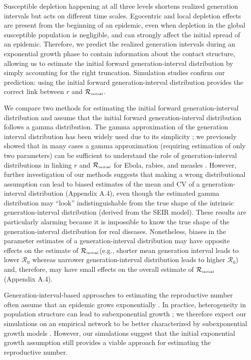 \documentclass[12pt]{article}
\newcommand{\Rx}[1]{\ensuremath{{\mathcal R}_{#1}}\xspace}
\newcommand{\Ro}{\Rx{0}}
\newcommand{\Rini}{\Rx{\textrm{\tiny initial}}}
\begin{document}
Susceptible depletion happening at all three levels shortens realized generation intervals but acts on different time scales.
Egocentric and local depletion effects are present from the beginning of an epidemic, even when depletion in the global susceptible population is negligible, and can strongly affect the initial spread of an epidemic.
Therefore, we predict the realized generation intervals during an exponential growth phase to contain information about the contact structure, allowing us to estimate the initial forward generation-interval distribution by simply accounting for the right truncation.
Simulation studies confirm our prediction: using the initial forward generation-interval distribution provides the correct link between $r$ and $\Rini$.

We compare two methods for estimating the initial forward generation-interval distribution and assume that the initial forward generation-interval distribution follows a gamma distribution.
The gamma approximation of the generation interval distribution has been widely used due to its simplicity \citep{mcbryde2009early, nishiura2009transmission, roberts2011early, trichereau2012estimation, nishiura2015theoretical};
we previously showed that in many cases a gamma approximation (requiring estimation of only two parameters) can be sufficient to understand the role of generation-interval distributions in linking $r$ and $\Rini$ for Ebola, rabies, and measles \citep{park2019practical}.
However, further investigation of our methods suggests that making a wrong distributional assumption can lead to biased estimates of the mean and CV of a generation-interval distribution (Appendix A.4), even though the estimated gamma distribution may ``look'' indistinguishable from the true shape of the intrinsic generation-interval distribution (derived from the SEIR model).
These results are particularly alarming because it is impossible to know the true shape of the generation-interval distribution for real diseases.
Nonetheless, biases in the parameter estimates of a generation-interval distribution may have opposite effects on the estimate of \Rini (e.g., shorter mean generation interval leads to lower \Ro whereas narrower generation-interval distribution leads to higher \Ro) and, therefore, may have small effects on the overall estimate of $\Rini$ (Appendix A.4).

Generation-interval-based approaches to estimating the reproductive number often assume that an epidemic grows exponentially \citep{wearing2005appropriate, wallinga2007generation, roberts2007model, park2019practical}.
In practice, heterogeneity in population structure can lead to subexponential growth \citep{szendroi2004polynomial, chowell2015western, chowell2016growing, chowell2016characterizing, kiskowski2016modeling, viboud2016generalized};
we therefore expect our simulations on an empirical network to be better characterized by subexponential growth models \citep{viboud2016generalized}.
However, our simulations suggest that the initial exponential growth assumption still provides a viable approach for estimating the reproductive number.
\end{document}
